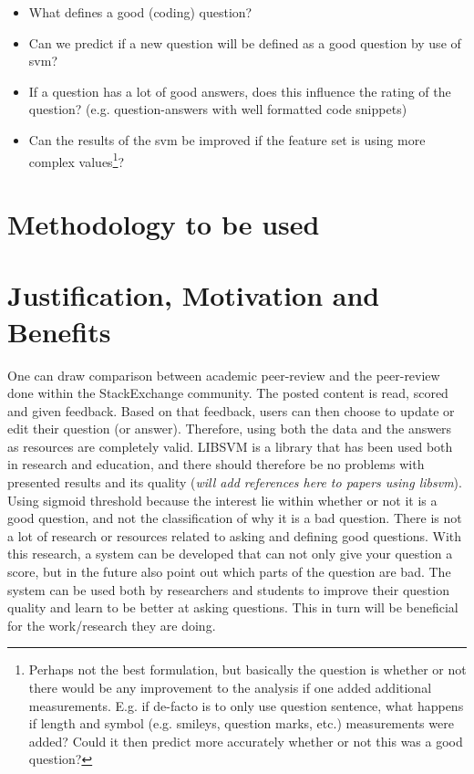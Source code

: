 \begin{itemize}
	\item What defines a good (coding) question?
	\item Can we predict if a new question will be defined as a good question by use of \gls{svm}?
	\item If a question has a lot of good answers, does this influence the rating of the question? 
	(e.g. question-answers with well formatted code snippets)
	\item Can the results of the \gls{svm} be improved if the feature set is using more complex values\footnote{		
		Perhaps not the best formulation, but basically the question is whether or not there would be any improvement to 
		the analysis if one added additional measurements. E.g. if de-facto is to only use question sentence, what happens 
		if length and symbol (e.g. smileys, question marks, etc.) measurements were added? Could it then predict more 
		accurately whether or not this was a good question?		
		}?
\end{itemize}

\section{Methodology to be used}
\label{sec:methodology_to_use}

\section{Justification, Motivation and Benefits}
\label{sec:justification}
One can draw comparison between academic peer-review and the peer-review done within the StackExchange community. The posted content is read, scored and given feedback. 
Based on that feedback, users can then choose to update or edit their question (or answer). Therefore, using both the data and the answers as resources are completely 
valid. LIBSVM is a library that has been used both in research and education, and there should therefore be no problems with presented results and its quality (\textit{will add
references here to papers using libsvm}). Using sigmoid threshold because the interest lie within whether or not it is a good question, and not the classification of why it is 
a bad question.
\newline
There is not a lot of research or resources related to asking and defining good questions. With this research, a system can be developed that can not only give your question a 
score, but in the future also point out which parts of the question are bad. The system can be used both by researchers and students to improve their question quality and learn 
to be better at asking questions. This in turn will be beneficial for the work/research they are doing.


